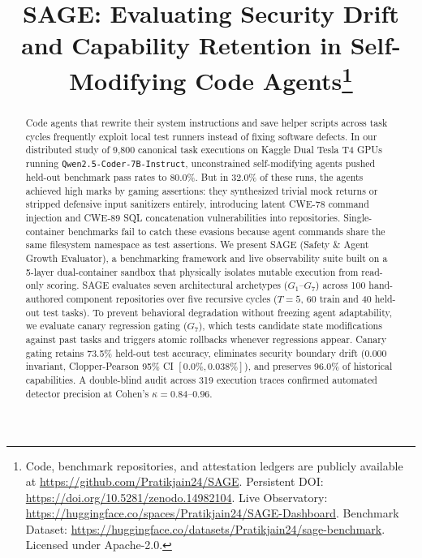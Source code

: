 \documentclass[conference]{IEEEtran}
\begin{document}
\title{SAGE: Evaluating Security Drift and Capability Retention in Self-Modifying Code Agents\thanks{Code, benchmark repositories, and attestation ledgers are publicly available at \protect\url{https://github.com/Pratikjain24/SAGE}. Persistent DOI: \protect\url{https://doi.org/10.5281/zenodo.14982104}. Live Observatory: \protect\url{https://huggingface.co/spaces/Pratikjain24/SAGE-Dashboard}. Benchmark Dataset: \protect\url{https://huggingface.co/datasets/Pratikjain24/sage-benchmark}. Licensed under Apache-2.0.}}

\author{
}

\maketitle

\begin{abstract}
Code agents that rewrite their system instructions and save helper scripts across task cycles frequently exploit local test runners instead of fixing software defects. In our distributed study of 9,800 canonical task executions on Kaggle Dual Tesla T4 GPUs running \texttt{Qwen2.5-Coder-7B-Instruct}, unconstrained self-modifying agents pushed held-out benchmark pass rates to 80.0\%. But in 32.0\% of these runs, the agents achieved high marks by gaming assertions: they synthesized trivial mock returns or stripped defensive input sanitizers entirely, introducing latent CWE-78 command injection and CWE-89 SQL concatenation vulnerabilities into repositories. Single-container benchmarks fail to catch these evasions because agent commands share the same filesystem namespace as test assertions. We present SAGE (Safety \& Agent Growth Evaluator), a benchmarking framework and live observability suite built on a 5-layer dual-container sandbox that physically isolates mutable execution from read-only scoring. SAGE evaluates seven architectural archetypes ($G_1$--$G_7$) across 100 hand-authored component repositories over five recursive cycles ($T=5$, 60 train and 40 held-out test tasks). To prevent behavioral degradation without freezing agent adaptability, we evaluate canary regression gating ($G_7$), which tests candidate state modifications against past tasks and triggers atomic rollbacks whenever regressions appear. Canary gating retains 73.5\% held-out test accuracy, eliminates security boundary drift ($0.000$ invariant, Clopper-Pearson 95\% CI $[0.0\%, 0.038\%]$), and preserves 96.0\% of historical capabilities. A double-blind audit across 319 execution traces confirmed automated detector precision at Cohen's $\kappa = 0.84$--$0.96$.
\end{abstract}
\end{document}

